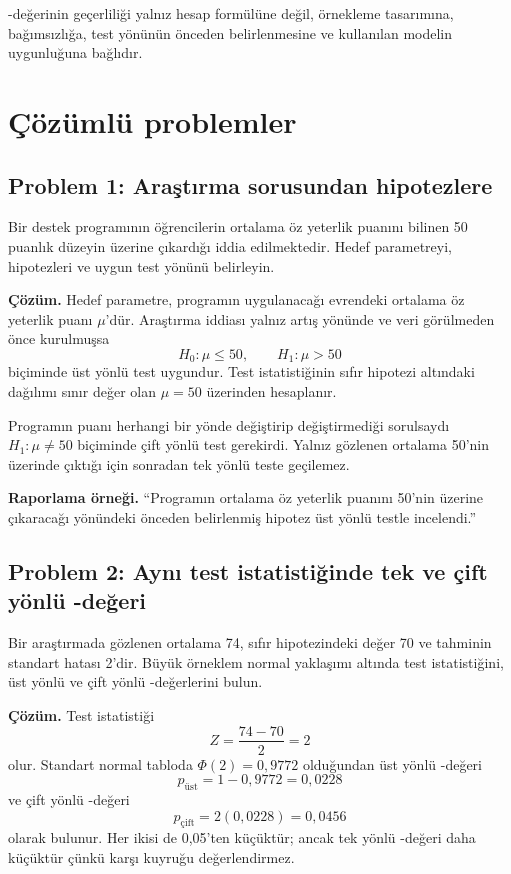 \begin{assumptionbox}
\pval-değerinin geçerliliği yalnız hesap formülüne değil, örnekleme tasarımına,
bağımsızlığa, test yönünün önceden belirlenmesine ve kullanılan modelin
uygunluğuna bağlıdır.
\end{assumptionbox}

\section{Çözümlü problemler}

\subsection*{Problem 1: Araştırma sorusundan hipotezlere}

Bir destek programının öğrencilerin ortalama öz yeterlik puanını bilinen 50
puanlık düzeyin üzerine çıkardığı iddia edilmektedir. Hedef parametreyi,
hipotezleri ve uygun test yönünü belirleyin.

\textbf{Çözüm.} Hedef parametre, programın uygulanacağı evrendeki ortalama öz
yeterlik puanı $\mu$'dür. Araştırma iddiası yalnız artış yönünde ve veri
görülmeden önce kurulmuşsa
\[
H_0:\mu\leq50,
\qquad
H_1:\mu>50
\]
biçiminde üst yönlü test uygundur. Test istatistiğinin sıfır hipotezi altındaki
dağılımı sınır değer olan $\mu=50$ üzerinden hesaplanır.

Programın puanı herhangi bir yönde değiştirip değiştirmediği sorulsaydı
$H_1:\mu\neq50$ biçiminde çift yönlü test gerekirdi. Yalnız gözlenen ortalama
50'nin üzerinde çıktığı için sonradan tek yönlü teste geçilemez.

\textbf{Raporlama örneği.} ``Programın ortalama öz yeterlik puanını 50'nin
üzerine çıkaracağı yönündeki önceden belirlenmiş hipotez üst yönlü testle
incelendi.''

\subsection*{Problem 2: Aynı test istatistiğinde tek ve çift yönlü \pval-değeri}

Bir araştırmada gözlenen ortalama 74, sıfır hipotezindeki değer 70 ve
tahminin standart hatası 2'dir. Büyük örneklem normal yaklaşımı altında test
istatistiğini, üst yönlü ve çift yönlü \pval-değerlerini bulun.

\textbf{Çözüm.} Test istatistiği
\[
Z=\frac{74-70}{2}=2
\]
olur. Standart normal tabloda $\Phi(2)=0{,}9772$ olduğundan üst yönlü
\pval-değeri
\[
p_{\text{üst}}=1-0{,}9772=0{,}0228
\]
ve çift yönlü \pval-değeri
\[
p_{\text{çift}}=2(0{,}0228)=0{,}0456
\]
olarak bulunur. Her ikisi de 0,05'ten küçüktür; ancak tek yönlü \pval-değeri daha
küçüktür çünkü karşı kuyruğu değerlendirmez.

